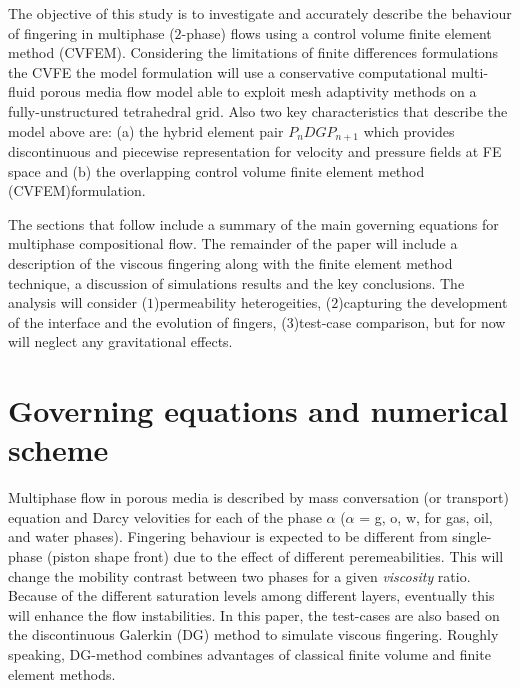 \documentclass[preprint,authoryear,12pt]{elsarticle}
\begin{document}
\medskip
The objective of this study is to investigate and accurately describe the behaviour of fingering in multiphase ($2$-phase) flows using a control volume finite element method (CVFEM). Considering the limitations of finite differences formulations the CVFE the model formulation will use a conservative computational multi-fluid porous media flow model able to exploit mesh adaptivity methods on a fully-unstructured tetrahedral grid. Also two key characteristics that describe the model above are: (a) the hybrid element pair $P_{n}DGP_{n+1}$ which provides discontinuous and piecewise representation for velocity and pressure fields at FE space and (b) the overlapping control volume finite element method (CVFEM)formulation.

\medskip
The sections that follow include a summary of the main governing equations for multiphase compositional flow. The remainder of the paper will include a description of the viscous fingering along with the finite element method technique, a discussion of simulations results and the key conclusions. The analysis will consider ($1$)permeability heterogeities, ($2$)capturing the development of the interface and the evolution of fingers, ($3$)test-case comparison, but for now will neglect any gravitational effects. 


\section{Governing equations and numerical scheme}\label{equations_scheme}      
Multiphase flow in porous media is described by mass conversation (or transport) equation and Darcy velovities for each of the phase $\alpha$ ($\alpha$ = g, o, w, for gas, oil, and water phases).
Fingering behaviour is expected to be different from single-phase (piston shape front) due to the effect of different peremeabilities. This will change the mobility contrast between two phases for a given \textit{viscosity} ratio. Because of the  different saturation levels among different layers, eventually this will enhance the flow instabilities. In this paper, the test-cases are also based on the discontinuous Galerkin (DG) method to simulate viscous fingering. Roughly speaking, DG-method combines advantages of classical finite volume and finite element methods.  

\end{document}
